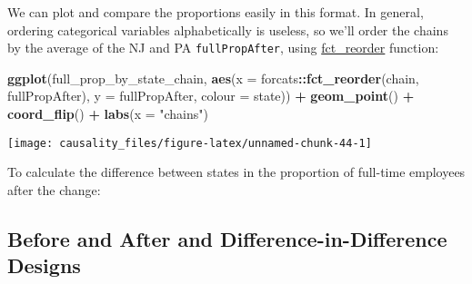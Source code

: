 \documentclass[]{book}
\newenvironment{Shaded}{\begin{snugshade}}{\end{snugshade}}
\newcommand{\CommentTok}[1]{\textcolor[rgb]{0.56,0.35,0.01}{\textit{#1}}}
\newcommand{\DataTypeTok}[1]{\textcolor[rgb]{0.13,0.29,0.53}{#1}}
\newcommand{\KeywordTok}[1]{\textcolor[rgb]{0.13,0.29,0.53}{\textbf{#1}}}
\newcommand{\NormalTok}[1]{#1}
\newcommand{\OperatorTok}[1]{\textcolor[rgb]{0.81,0.36,0.00}{\textbf{#1}}}
\newcommand{\StringTok}[1]{\textcolor[rgb]{0.31,0.60,0.02}{#1}}
\theoremstyle{definition}
\theoremstyle{definition}
\theoremstyle{definition}
\theoremstyle{remark}
\begin{document}
We can plot and compare the proportions easily in this format. In
general, ordering categorical variables alphabetically is useless, so
we'll order the chains by the average of the NJ and PA
\texttt{fullPropAfter}, using
\href{https://www.rdocumentation.org/packages/forcats/topics/fct_reorder}{fct\_reorder}
function:

\begin{Shaded}
\begin{Highlighting}[]
\KeywordTok{ggplot}\NormalTok{(full_prop_by_state_chain,}
       \KeywordTok{aes}\NormalTok{(}\DataTypeTok{x =}\NormalTok{ forcats}\OperatorTok{::}\KeywordTok{fct_reorder}\NormalTok{(chain, fullPropAfter),}
           \DataTypeTok{y =}\NormalTok{ fullPropAfter,}
           \DataTypeTok{colour =}\NormalTok{ state)) }\OperatorTok{+}
\StringTok{  }\KeywordTok{geom_point}\NormalTok{() }\OperatorTok{+}
\StringTok{  }\KeywordTok{coord_flip}\NormalTok{() }\OperatorTok{+}
\StringTok{  }\KeywordTok{labs}\NormalTok{(}\DataTypeTok{x =} \StringTok{"chains"}\NormalTok{)}
\end{Highlighting}
\end{Shaded}

\begin{center}\texttt{[image: causality\_files/figure-latex/unnamed-chunk-44-1]} \end{center}

To calculate the difference between states in the proportion of
full-time employees after the change:

\begin{Shaded}
\end{Shaded}

\hypertarget{before-and-after-and-difference-in-difference-designs}{%
\subsection{Before and After and Difference-in-Difference
Designs}\label{before-and-after-and-difference-in-difference-designs}}
\end{document}

